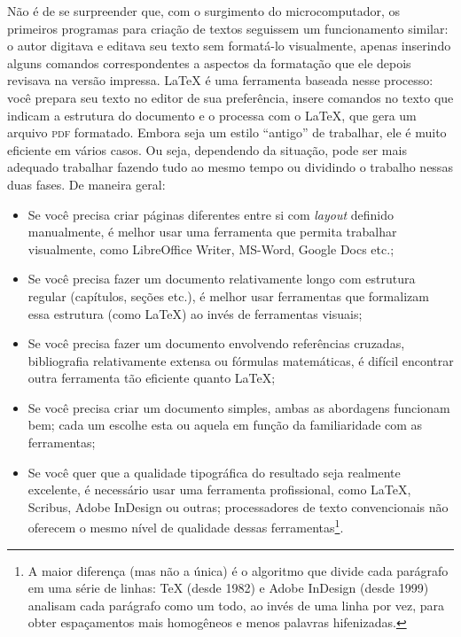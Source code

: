 Não é de se surpreender que, com o surgimento do microcomputador, os primeiros
programas para criação de textos seguissem um funcionamento similar: o autor
digitava e editava seu texto sem formatá-lo visualmente, apenas inserindo
alguns comandos correspondentes a aspectos da formatação que ele depois
revisava na versão impressa. \LaTeX{} é uma ferramenta baseada nesse processo:
você prepara seu texto no editor de sua preferência, insere comandos no texto
que indicam a estrutura do documento e o processa com o \LaTeX{}, que gera um
arquivo \textsc{pdf} formatado. Embora seja um estilo ``antigo'' de trabalhar,
ele é muito eficiente em vários casos. Ou seja, dependendo da situação, pode
ser mais adequado trabalhar fazendo tudo ao mesmo tempo ou dividindo o trabalho
nessas duas fases. De maneira geral:

\begin{itemize}
\item Se você precisa criar páginas diferentes entre si com \emph{layout}
definido manualmente, é melhor usar uma ferramenta que permita trabalhar
visualmente, como LibreOffice Writer, MS-Word, Google Docs etc.;

\item Se você precisa fazer um documento relativamente longo com estrutura
regular (capítulos, seções etc.), é melhor usar ferramentas que formalizam
essa estrutura (como \LaTeX{}) ao invés de ferramentas visuais;

\item Se você precisa fazer um documento envolvendo referências cruzadas,
bibliografia relativamente extensa ou fórmulas matemáticas, é difícil
encontrar outra ferramenta tão eficiente quanto \LaTeX{};

\item Se você precisa criar um documento simples, ambas as abordagens
funcionam bem; cada um escolhe esta ou aquela em função da familiaridade
com as ferramentas;

\item Se você quer que a qualidade tipográfica do resultado seja realmente
excelente, é necessário usar uma ferramenta profissional, como \LaTeX{},
Scribus, Adobe InDesign ou outras; processadores de texto convencionais não
oferecem o mesmo nível de qualidade dessas ferramentas\footnote{A maior
diferença (mas não a única) é o algoritmo que divide cada parágrafo em uma
série de linhas: \TeX{} (desde 1982) e Adobe InDesign (desde 1999) analisam
cada parágrafo como um todo, ao invés de uma linha por vez, para obter
espaçamentos mais homogêneos e menos palavras hifenizadas.}.
\end{itemize}

